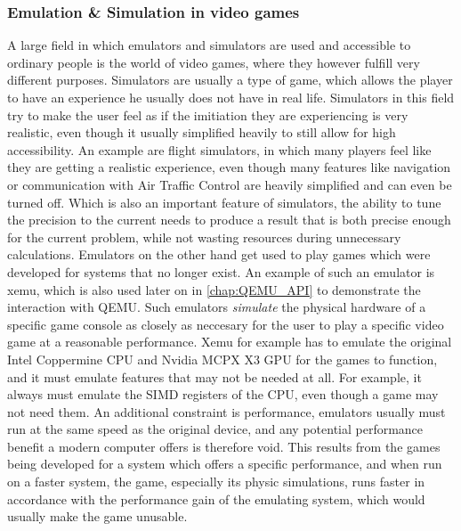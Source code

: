 \subsubsection{Emulation \& Simulation in video games}
A large field in which emulators and simulators are used and accessible to ordinary people
is the world of video games,
where they however fulfill very different purposes.
Simulators are usually a type of game,
which allows the player to have an experience he usually does not have in real life.
Simulators in this field try to make the user feel as if the imitiation they are experiencing is very realistic,
even though it usually simplified heavily to still allow for high accessibility.
An example are flight simulators, in which many players feel like they are getting a realistic experience,
even though many features like navigation or communication with Air Traffic Control are heavily simplified
and can even be turned off.
Which is also an important feature of simulators, the ability to tune the precision
to the current needs to produce a result that is both precise enough for the current problem,
while not wasting resources during unnecessary calculations.\linebreak
Emulators on the other hand get used to play games which were developed for systems that no longer exist.
An example of such an emulator is xemu\cite{xemu},
which is also used later on in \autoref{chap:QEMU_API} to demonstrate the interaction with QEMU.
Such emulators \emph{simulate} the physical hardware of a specific game console
as closely as neccesary for the user to play a specific video game at a reasonable performance.
Xemu for example has to emulate the original Intel Coppermine CPU and Nvidia MCPX X3 GPU
for the games to function, and it must emulate features that may not be needed at all.
For example, it always must emulate the SIMD registers of the CPU, even though a game may not need them.
An additional constraint is performance, emulators usually must run at the same speed as the original device,
and any potential performance benefit a modern computer offers is therefore void.
This results from the games being developed for a system which offers a specific performance,
and when run on a faster system, the game, especially its physic simulations,
runs faster in accordance with the performance gain of the emulating system,
which would usually make the game unusable.

